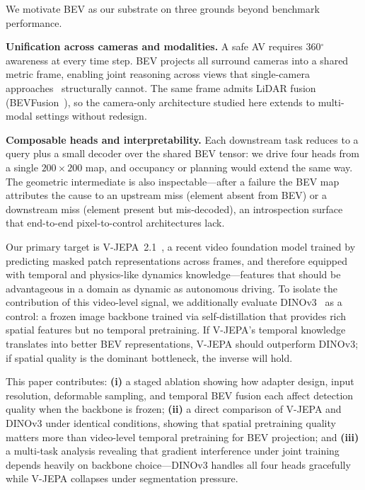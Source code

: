 \documentclass[12pt]{article}
\begin{document}
We motivate BEV as our substrate on three grounds beyond benchmark performance.

\textbf{Unification across cameras and modalities.} A safe AV requires 360$^\circ$ awareness at every time step. BEV projects all surround cameras into a shared metric frame, enabling joint reasoning across views that single-camera approaches~\cite{drivejepa} structurally cannot. The same frame admits LiDAR fusion (BEVFusion~\cite{bevfusion}), so the camera-only architecture studied here extends to multi-modal settings without redesign.

\textbf{Composable heads and interpretability.} Each downstream task reduces to a query plus a small decoder over the shared BEV tensor: we drive four heads from a single $200\!\times\!200$ map, and occupancy or planning would extend the same way. The geometric intermediate is also inspectable---after a failure the BEV map attributes the cause to an upstream miss (element absent from BEV) or a downstream miss (element present but mis-decoded), an introspection surface that end-to-end pixel-to-control architectures lack.

Our primary target is V-JEPA~2.1~\cite{vjepa}, a recent video foundation model trained by predicting masked patch representations across frames, and therefore equipped with temporal and physics-like dynamics knowledge---features that should be advantageous in a domain as dynamic as autonomous driving. To isolate the contribution of this video-level signal, we additionally evaluate DINOv3~\cite{dinov3} as a control: a frozen image backbone trained via self-distillation that provides rich spatial features but no temporal pretraining. If V-JEPA's temporal knowledge translates into better BEV representations, V-JEPA should outperform DINOv3; if spatial quality is the dominant bottleneck, the inverse will hold.

This paper contributes: \textbf{(i)} a staged ablation showing how adapter design, input resolution, deformable sampling, and temporal BEV fusion each affect detection quality when the backbone is frozen; \textbf{(ii)} a direct comparison of V-JEPA and DINOv3 under identical conditions, showing that spatial pretraining quality matters more than video-level temporal pretraining for BEV projection; and \textbf{(iii)} a multi-task analysis revealing that gradient interference under joint training depends heavily on backbone choice---DINOv3 handles all four heads gracefully while V-JEPA collapses under segmentation pressure.

\end{document}
